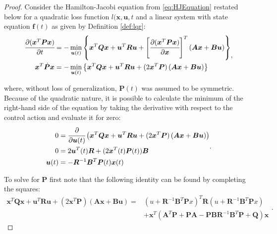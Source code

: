 \documentclass[a4paper,11pt]{book}
\numberwithin{figure}{chapter}
\numberwithin{equation}{chapter}
\numberwithin{table}{chapter}
\theoremstyle{definition}
\begin{document}
\begin{proof}
    Consider the Hamilton-Jacobi equation from \eqref{eq:HJEquation} restated below for a quadratic loss function $l(\bm{x}, \bm{u}, t$ and a linear system with state equation $\bm{f}(t)$ as given by Definition \ref{def:lqr}:
    \begin{equation}
    \begin{split}
        \cfrac{\partial (\bm{x}^T \bm{P} \bm{x})}{\partial t} &=  - \min_{\bm{u}(t)} \left\{ \bm{x}^T \bm{Q} \bm{x} + \bm{u}^T \bm{R} \bm{u} + \left[ \cfrac{\partial (\bm{x}^T \bm{P} \bm{x})}{\partial \bm{x}} \right]^T \left( \bm{A} \bm{x} + \bm{B} \bm{u} \right) \right\} \\
        \bm{x}^T \dot{\bm{P}} \bm{x} &= - \min_{\bm{u}(t)} \left\{ \bm{x}^T \bm{Q} \bm{x} + \bm{u}^T \bm{R} \bm{u} + (2 \bm{x}^T \bm{P}) \left( \bm{A} \bm{x} + \bm{B} \bm{u} \right) \right\}
    \end{split}
    ,\end{equation}
    
    \noindent where, without loss of generalization, $\bm{P}(t)$ was assumed to be symmetric. Because of the quadratic nature, it is possible to calculate the minimum of the right-hand side of the equation by taking the derivative with respect to the control action and evaluate it for zero:
    \begin{equation}
    \begin{split}
        0 &= \cfrac{\partial}{\partial \bm{u}(t)} \left( \bm{x}^T \bm{Q} \bm{x} + \bm{u}^T \bm{R} \bm{u} + (2 \bm{x}^T \bm{P}) \left( \bm{A} \bm{x} + \bm{B} \bm{u} \right) \right) \\
        0 &= 2 \bm{u}^T(t) \bm{R} + (2 \bm{x}^T(t) \bm{P}(t)) \bm{B} \\
        \bm{u}(t) &= - \bm{R}^{-1}  \bm{B}^T \bm{P}(t) \bm{x}(t)
    \end{split}
    .\end{equation}
    
    To solve for $\bm{P}$ first note that the following identity can be found by completing the squares:
    \begin{equation}
    \begin{split}
        \bm{x}^T \bm{Q} \bm{x} + \bm{u}^T \bm{R} \bm{u} + (2 \bm{x}^T \bm{P}) \left( \bm{A} \bm{x} + \bm{B} \bm{u} \right) = & (u + \bm{R}^{-1} \bm{B}^T \bm{P} x)^T \bm{R} (u + \bm{R}^{-1} \bm{B}^T \bm{P} x) \\ & + \bm{x}^T (\bm{A}^T \bm{P} + \bm{P} \bm{A} - \bm{P} \bm{B} \bm{R}^{-1} \bm{B}^T \bm{P} + \bm{Q}) \bm{x}
    \end{split}
    .\end{equation}
    

\end{proof}
\end{document}
